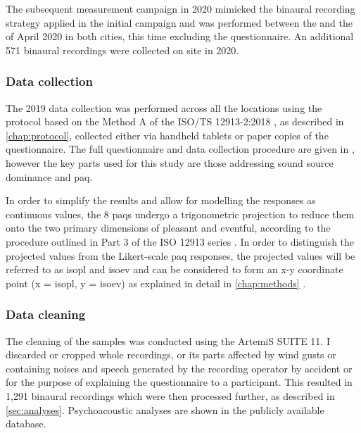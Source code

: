    The subsequent measurement campaign in 2020 mimicked the binaural recording strategy applied in the initial campaign and was performed between the  and the  of April 2020 in both cities, this time excluding the questionnaire. An additional 571 binaural recordings were collected on site in 2020.

   \subsubsection{Data collection}
   The 2019 data collection was performed across all the locations using the protocol based on the Method A of the ISO/TS 12913-2:2018 \citep{ISO12913Part2}, as described in \cref{chap:protocol}, collected either via handheld tablets or paper copies of the questionnaire. The full questionnaire and data collection procedure are given in \citet{Mitchell2020Soundscape}, however the key parts used for this study are those addressing sound source dominance and \gls{paq}.

   In order to simplify the results and allow for modelling the responses as continuous values, the 8 \glspl{paq} undergo a trigonometric projection to reduce them onto the two primary dimensions of pleasant and eventful, according to the procedure outlined in Part 3 of the ISO 12913 series \citep{ISO12913Part3}. In order to distinguish the projected values from the Likert-scale \gls{paq} responses, the projected values will be referred to as \gls{isopl} and \gls{isoev} and can be considered to form an x-y coordinate point (x = \gls{isopl}, y = \gls{isoev}) as explained in detail in \cref{chap:methods} \citep{Lionello2021Introducing}.

   \subsubsection{Data cleaning}
   The cleaning of the samples was conducted using the ArtemiS SUITE 11. I discarded or cropped whole recordings, or its parts affected by wind gusts or containing noises and speech generated by the recording operator by accident or for the purpose of explaining the questionnaire to a participant. This resulted in 1,291 binaural recordings which were then processed further, as described in \cref{sec:analyses}. Psychoacoustic analyses are shown in the publicly available database.

